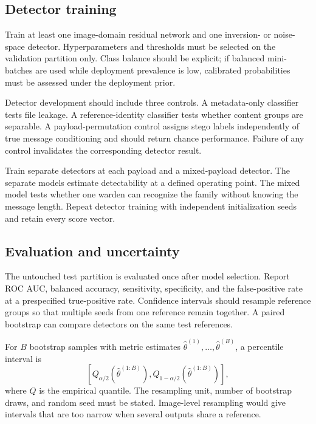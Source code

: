 \documentclass[pdflatex,sn-mathphys-num]{sn-jnl}
\begin{document}
\begin{appendices}
\subsection{Detector training}

Train at least one image-domain residual network and one inversion- or noise-space detector. Hyperparameters and thresholds must be selected on the validation partition only. Class balance should be explicit; if balanced mini-batches are used while deployment prevalence is low, calibrated probabilities must be assessed under the deployment prior.

Detector development should include three controls. A metadata-only classifier tests file leakage. A reference-identity classifier tests whether content groups are separable. A payload-permutation control assigns stego labels independently of true message conditioning and should return chance performance. Failure of any control invalidates the corresponding detector result.

Train separate detectors at each payload and a mixed-payload detector. The separate models estimate detectability at a defined operating point. The mixed model tests whether one warden can recognize the family without knowing the message length. Repeat detector training with independent initialization seeds and retain every score vector.

\subsection{Evaluation and uncertainty}

The untouched test partition is evaluated once after model selection. Report ROC AUC, balanced accuracy, sensitivity, specificity, and the false-positive rate at a prespecified true-positive rate. Confidence intervals should resample reference groups so that multiple seeds from one reference remain together. A paired bootstrap can compare detectors on the same test references.

For $B$ bootstrap samples with metric estimates $\widehat{\theta}^{(1)},\ldots,\widehat{\theta}^{(B)}$, a percentile interval is
\begin{equation}
\left[
Q_{\alpha/2}(\widehat{\theta}^{(1:B)}),
Q_{1-\alpha/2}(\widehat{\theta}^{(1:B)})
\right],
\label{eq:bootstrap}
\end{equation}
where $Q$ is the empirical quantile. The resampling unit, number of bootstrap draws, and random seed must be stated. Image-level resampling would give intervals that are too narrow when several outputs share a reference.


\end{appendices}
\end{document}
